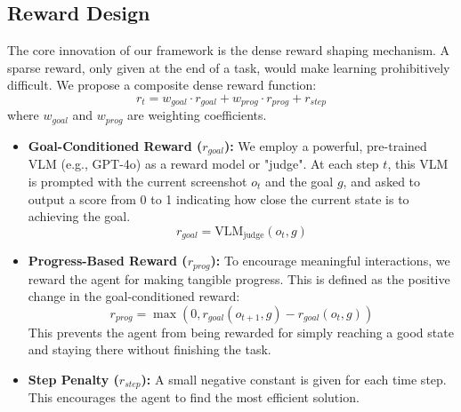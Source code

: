 \documentclass{article}
\begin{document}
\subsection{Reward Design}
The core innovation of our framework is the dense reward shaping mechanism. A sparse reward, only given at the end of a task, would make learning prohibitively difficult. We propose a composite dense reward function:
\begin{equation}
    r_t = w_{goal} \cdot r_{goal} + w_{prog} \cdot r_{prog} + r_{step}
\end{equation}
where $w_{goal}$ and $w_{prog}$ are weighting coefficients.

\begin{itemize}
    \item \textbf{Goal-Conditioned Reward ($r_{goal}$):} We employ a powerful, pre-trained VLM (e.g., GPT-4o) as a reward model or "judge". At each step $t$, this VLM is prompted with the current screenshot $o_t$ and the goal $g$, and asked to output a score from 0 to 1 indicating how close the current state is to achieving the goal.
    \begin{equation}
        r_{goal} = \text{VLM}_{\text{judge}}(o_t, g)
    \end{equation}
    \item \textbf{Progress-Based Reward ($r_{prog}$):} To encourage meaningful interactions, we reward the agent for making tangible progress. This is defined as the positive change in the goal-conditioned reward:
    \begin{equation}
        r_{prog} = \max(0, r_{goal}(o_{t+1}, g) - r_{goal}(o_t, g))
    \end{equation}
    This prevents the agent from being rewarded for simply reaching a good state and staying there without finishing the task.
    \item \textbf{Step Penalty ($r_{step}$):} A small negative constant is given for each time step. This encourages the agent to find the most efficient solution.
\end{itemize}
\end{document}
